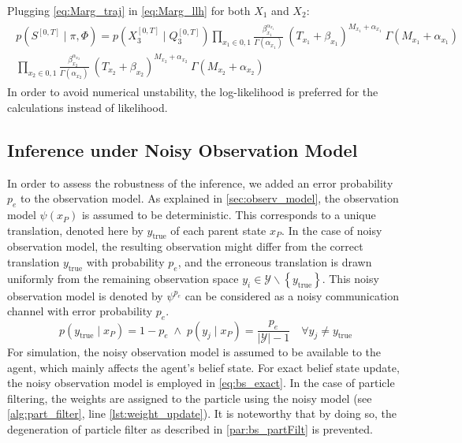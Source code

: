 Plugging \autoref{eq:Marg_traj} in \autoref{eq:Marg_llh} for both $ X_{1} $ and $ X_{2} $:
\begin{align}
\begin{split}
p(S^{[0,T]} \mid \pi, \Phi ) = p(X_{3}^{[0, T]}\mid Q_{3}^{[0, T]}) \prod_{x_{1}\in{0,1}} \frac{\beta_{x_{1}}^{\alpha_{x_{1}}}}{\Gamma(\alpha_{x_{1}})} \ (T_{x_{1}}+\beta_{x_{1}})^{M_{x_{1}} + \alpha_{x_{1}}}\ \Gamma(M_{x_{1}} + \alpha_{x_{1}})  \\  \prod_{x_{2}\in{0,1}} \frac{\beta_{x_{2}}^{\alpha_{x_{2}}}}{\Gamma(\alpha_{x_{2}})} \ (T_{x_{2}}+\beta_{x_{2}})^{M_{x_{2}} + \alpha_{x_{2}}}\ \Gamma(M_{x_{2}} + \alpha_{x_{2}})
\label{eq:Marg_llh_final}
\end{split}
\end{align}
In order to avoid numerical unstability, the log-likelihood is preferred for the calculations instead of likelihood.
\subsection{Inference under Noisy Observation Model}
\label{sec:noisy_robustness}
In order to assess the robustness of the inference, we added an error probability $ p_e $ to the observation model. As explained in \cref{sec:observ_model}, the observation model $ \psi(x_P) $ is assumed to be deterministic. This corresponds to a unique translation, denoted here by $ y_\text{true} $ of each parent state $ x_P $. In the case of noisy observation model, the resulting observation might differ from the correct translation $ y_\text{true} $ with probability $ p_e $, and the erroneous translation is drawn uniformly from the remaining observation space $ y_i \in \mathcal{Y} \backslash \left\lbrace y_\text{true}\right\rbrace $. This noisy observation model is denoted by $ \psi^{p_e} $ can be considered as a noisy communication channel with error probability $ p_e $. \begin{equation}
p(y_\text{true} \mid x_P) = 1-p_e \;\wedge \;p(y_j \mid x_P) = \frac{p_e}{|\mathcal{Y}|-1} \quad \forall y_j \neq y_\text{true}
\label{eq:noicy_obs_model}
\end{equation} 
For simulation, the noisy observation model is assumed to be available to the agent, which mainly affects the agent's belief state. For exact belief state update, the noisy observation model is employed in \autoref{eq:bs_exact}. In the case of particle filtering, the weights are assigned to the particle using the noisy model (see \cref{alg:part_filter}, line \autoref{lst:weight_update}). It is noteworthy that by doing so, the degeneration of particle filter as described in \cref{par:bs_partFilt} is prevented.

